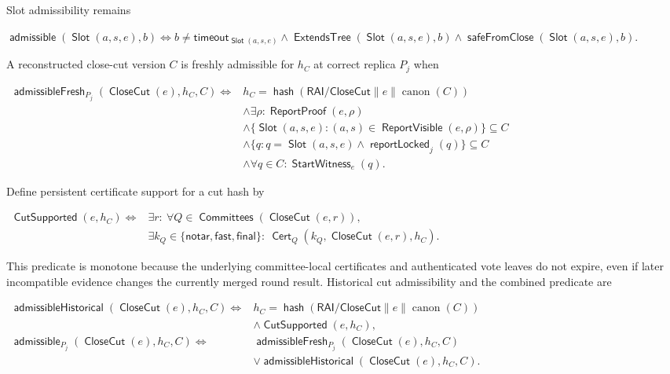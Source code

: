 \documentclass[sigplan,twocolumn,review,anonymous]{acmart}
\newcommand{\func}[1]{\operatorname{\mathsf{#1}}}
\newcommand{\hash}{\func{hash}}
\newcommand{\Cert}{\func{Cert}}
\newcommand{\Slot}{\func{Slot}}
\newcommand{\CloseCut}{\func{CloseCut}}
\newcommand{\admissible}{\func{admissible}}
\newcommand{\admissibleFresh}{\func{admissibleFresh}}
\newcommand{\admissibleHistorical}{\func{admissibleHistorical}}
\newcommand{\ExtendsTree}{\func{ExtendsTree}}
\newcommand{\timeoutVal}{\mathsf{timeout}}
\newcommand{\notarKind}{\mathsf{notar}}
\newcommand{\fastKind}{\mathsf{fast}}
\newcommand{\finalKind}{\mathsf{final}}
\newcommand{\Committees}{\func{Committees}}
\newcommand{\reportLocked}{\func{reportLocked}}
\newcommand{\safeFromClose}{\func{safeFromClose}}
\newcommand{\ReportProof}{\func{ReportProof}}
\newcommand{\ReportVisible}{\func{ReportVisible}}
\begin{document}
Slot admissibility remains
\begin{center}
\begin{adjustbox}{max width=\columnwidth}
\(\displaystyle
\admissible(\Slot(a,s,e),b)\iff
b\neq\timeoutVal_{\Slot(a,s,e)}\wedge\ExtendsTree(\Slot(a,s,e),b)
\wedge\safeFromClose(\Slot(a,s,e),b).
\)
\end{adjustbox}
\end{center}

A reconstructed close-cut version \(C\) is freshly admissible for \(h_C\) at correct replica \(P_j\)
when
\begin{center}
\begin{adjustbox}{max width=\columnwidth}
\(\displaystyle
\begin{aligned}
\admissibleFresh_{P_j}(\CloseCut(e),h_C,C)\iff{}&
 h_C=\hash(\mathsf{RAI/CloseCut}\parallel e\parallel\operatorname{canon}(C))\\
&\wedge\exists\rho:\ReportProof(e,\rho)\\
&\wedge\{\Slot(a,s,e):(a,s)\in\ReportVisible(e,\rho)\}\subseteq C\\
&\wedge\{q:q=\Slot(a,s,e)\wedge\reportLocked_j(q)\}\subseteq C\\
&\wedge\forall q\in C:\func{StartWitness}_e(q).
\end{aligned}
\)
\end{adjustbox}
\end{center}
Define persistent certificate support for a cut hash by
\begin{center}
\begin{adjustbox}{max width=\columnwidth}
\(\displaystyle
\begin{aligned}
\func{CutSupported}(e,h_C)\iff{}&\exists r:\ \forall Q\in\Committees(\CloseCut(e,r)),\\
&\exists k_Q\in\{\notarKind,\fastKind,\finalKind\}:\
\Cert_Q(k_Q,\CloseCut(e,r),h_C).
\end{aligned}
\)
\end{adjustbox}
\end{center}
This predicate is monotone because the underlying committee-local certificates and authenticated vote leaves
do not expire, even if later incompatible evidence changes the currently merged round result.
Historical cut admissibility and the combined predicate are
\begin{center}
\begin{adjustbox}{max width=\columnwidth}
\(\displaystyle
\begin{aligned}
\admissibleHistorical(\CloseCut(e),h_C,C)\iff{}&
 h_C=\hash(\mathsf{RAI/CloseCut}\parallel e\parallel\operatorname{canon}(C))\\
&\wedge\func{CutSupported}(e,h_C),\\
\admissible_{P_j}(\CloseCut(e),h_C,C)\iff{}&
 \admissibleFresh_{P_j}(\CloseCut(e),h_C,C)\\
&\vee\admissibleHistorical(\CloseCut(e),h_C,C).
\end{aligned}
\)
\end{adjustbox}
\end{center}
\end{document}

